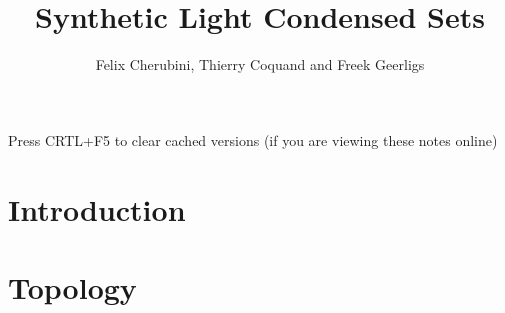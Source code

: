 \documentclass{../util/zariski-small}
\title{Synthetic Light Condensed Sets}
\begin{document}
\author{Felix Cherubini, Thierry Coquand and Freek Geerligs}

\maketitle

\begin{center}
  \color{purple}
  \large{Press CRTL+F5 to clear cached versions}
  \large{(if you are viewing these notes online)}
\end{center}

\newcommand{\Boole}{\mathsf{Boole}}
\newcommand{\Stone}{\mathsf{Stone}}


\section*{Introduction}


\section{Topology}


\printindex

\printbibliography
\end{document}
